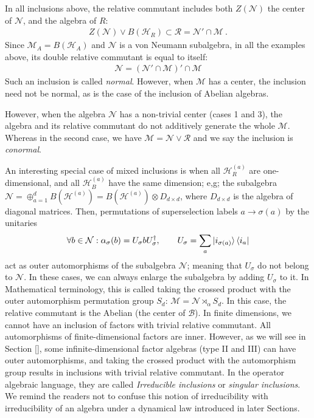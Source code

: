 \documentclass[a4paper,11pt]{article}
\theoremstyle{definition}
\newcommand{\mB}{\mathcal{B}}%
\newcommand{\mR}{\mathcal{R}}
\newcommand{\mN}{\mathcal{N}}
\newcommand{\mH}{\mathcal{H}}
\newcommand{\mM}{\mathcal{M}}
\begin{document}
In all inclusions above, the relative commutant includes both $Z(\mN)$ the center of $\mN$, and the algebra of $R$:
\begin{align}
    Z(\mN)\vee B(\mH_R)\subset \mR=\mN'\cap \mM\ .
\end{align}
Since $\mM_A=B(\mH_A)$ and $\mN$ is a von Neumann subalgebra, in all the examples above, its double relative commutant is equal to itself:
\begin{align}
    \mN=(\mN'\cap \mM)'\cap\mM
\end{align}
Such an inclusion is called {\it normal}. However, when $\mM$ has a center, the inclusion need not be normal, as is the case of the inclusion of Abelian algebras. 

However, when the algebra $\mN$ has a non-trivial center (cases 1 and 3), the algebra and its relative commutant do not additively generate the whole $\mM$. Whereas in the second case, we have $\mM=\mN\vee \mR$ and we say the inclusion is {\it conormal}.

An interesting special case of mixed inclusions is when all $\mH_R^{(a)}$ are one-dimensional, and all $\mH_B^{(a)}$ have the same dimension; e,g; the subalgebra $\mN=\oplus_{a=1}^d B(\mH^{(a)})=B(\mH^{(a)})\otimes D_{d\times d}$, where $D_{d\times d}$ is the algebra of diagonal matrices. Then, permutations of superselection labels $a\to \sigma(a)$ by the unitaries
 \begin{align}
    \forall b\in\mN: \alpha_\sigma(b)=U_\sigma b U_\sigma^\dagger,\qquad U_{\sigma}=\sum_a \ket{i_{\sigma(a)}}\bra{i_a}
 \end{align}
act as outer automorphisms of the subalgebra $\mN$; meaning that $U_\sigma$ do not belong to $\mN$. In these cases, we can always enlarge the subalgebra by adding $U_\sigma$ to it. In Mathematical terminology, this is called taking the crossed product with the outer automorphism permutation group $S_d$: $\mM=\mN\rtimes_\alpha S_d$. In this case, the relative commutant is the Abelian (the center of $\mB$). In finite dimensions, we cannot have an inclusion of factors with trivial relative commutant. All automorphisms of finite-dimensional factors are inner. However, as we will see in Section \ref{}, some infinite-dimensional factor algebras (type II and III) can have outer automorphisms, and taking the crossed product with the automorphism group results in inclusions with trivial relative commutant. In the operator algebraic language, they are called {\it Irreducible inclusions} or {\it singular inclusions}. We remind the readers not to confuse this notion of irreducibility with irreducibility of an algebra under a dynamical law introduced in later Sections.
\end{document}
